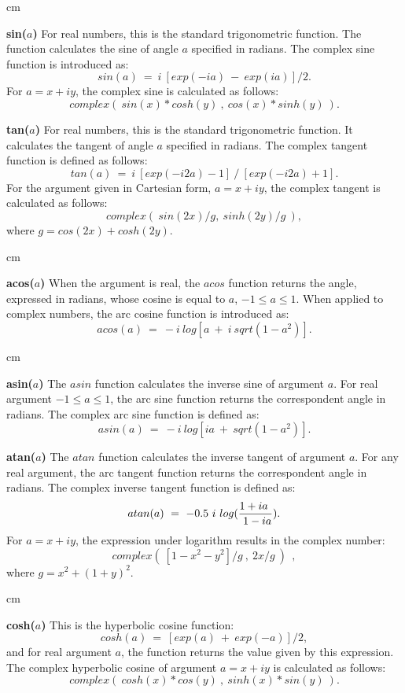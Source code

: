  cm

{\bf sin($a$)}\hfil\break
For real numbers, this is the standard trigonometric function.
The function calculates the sine of angle $a$ specified in radians.
The complex sine function is introduced as:
$$sin(a)\ = \ i\ [exp(-ia)\ -\ exp(ia)]/2 .$$
For $a=x+iy$, the complex sine is calculated as follows:
$$complex(\
sin(x)*cosh(y)\ ,\ cos(x)*sinh(y)\
) .$$

\newpage

{\bf tan($a$)}\hfil\break
For real numbers, this is the standard trigonometric function.
It calculates the tangent of angle $a$ specified in radians.
The complex tangent function is defined as follows: 
$$tan(a)\ = \ i\ [exp(-i2a)-1]\ /\ [exp(-i2a)+1] .$$
For the argument given in Cartesian form, $a=x+iy$, 
the complex tangent is calculated as follows:
$$complex(\ sin(2x)/g ,\ sinh(2y)/g\ ) ,$$
where $g=cos(2x)+cosh(2y)$.

 cm

{\bf acos($a$)}\hfil\break
When the argument is real,
the $acos$ function returns the angle, expressed in radians,
whose cosine is equal to $a$, $-1 \le a \le 1$.
When applied to complex numbers, the arc cosine function
is introduced as:
$$acos(a)\ =\ -i\ log[a\ +\ i\ sqrt(1-a^2)] .$$

 cm

{\bf asin($a$)}\hfil\break
The $asin$ function calculates the inverse sine of argument $a$.
For real argument $-1 \le a \le 1$,
the arc sine function returns the correspondent angle in radians.
The complex arc sine function is defined as:
$$asin(a)\ = \ -i\ log[ia\ +\ sqrt(1-a^2)] .$$

\newpage

{\bf atan($a$)}\hfil\break
The $atan$ function calculates the inverse tangent of argument $a$.
For any real argument,
the arc tangent function returns the correspondent angle in radians.
The complex inverse tangent function is defined as:
$$atan(a)\ =\ -0.5\ i\ log ( { {1+ia}\ \over\ {1-ia} }) .$$
For $a=x+iy$, the expression under logarithm results in
the complex number:
$$complex(\ [1-x^2-y^2]/g\ ,\ 2x/g\ ) ~~,$$
where $g = x^2 + (1+y)^2$.

 cm

{\bf cosh($a$)}\hfil\break
This is the hyperbolic cosine function:
$$cosh(a)\ =\ [exp(a)\ +\ exp(-a)]/2 ,$$
and for real argument $a$, the function returns the value
given by this expression.
The complex hyperbolic cosine of argument $a=x+iy$
is calculated as follows:
$$complex(\
cosh(x)*cos(y)\ ,\ sinh(x)*sin(y)\
) .$$

